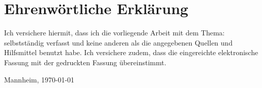 
\clearpage
\chapter*{Ehrenwörtliche Erklärung}


Ich versichere hiermit, dass ich die vorliegende Arbeit
 mit dem Thema: \textit{\DerTitelDerArbeit} selbstständig verfasst und keine anderen als die angegebenen Quellen und
Hilfsmittel benutzt habe. Ich versichere zudem,
dass die eingereichte elektronische Fassung mit der gedruckten Fassung übereinstimmt.

\vspace{3cm}
Mannheim, \today \hfill \DerAutorDerArbeit
